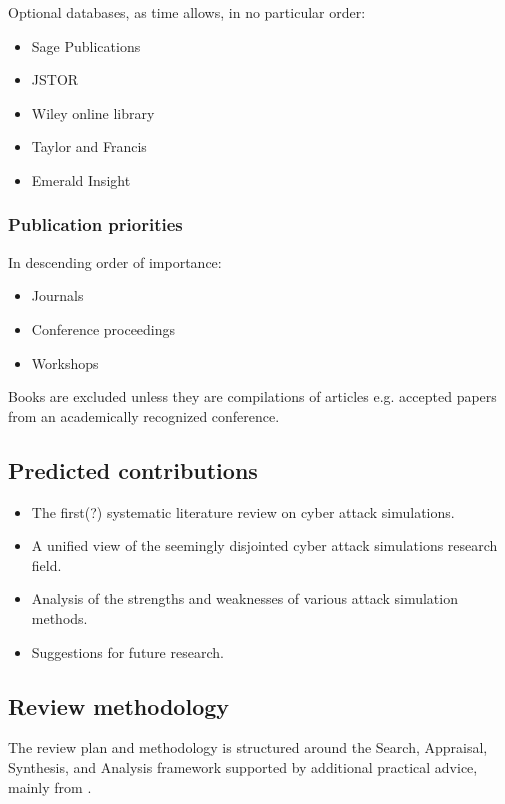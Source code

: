 \documentclass{article}
\begin{document}
\noindent Optional databases, as time allows, in no particular order:
\begin{itemize}
    \item Sage Publications
    \item JSTOR
    \item Wiley online library
    \item Taylor and Francis
    \item Emerald Insight
\end{itemize}

\subsubsection{Publication priorities}
In descending order of importance:
\begin{itemize}
    \item Journals
    \item Conference proceedings
    \item Workshops
\end{itemize}

\noindent Books are excluded unless they are compilations of articles e.g. accepted papers from an academically recognized conference.

\subsection{Predicted contributions}
\begin{itemize}
    \item The first(?) systematic literature review on cyber attack simulations.
    \item A unified view of the seemingly disjointed cyber attack simulations research field.
    \item Analysis of the strengths and weaknesses of various attack simulation methods.
    \item Suggestions for future research.
\end{itemize}

\subsection{Review methodology}

The review plan and methodology is structured around the Search, Appraisal, Synthesis, and Analysis framework \cite{booth2012} supported by additional practical advice, mainly from \cite{Kitchenham07, okoli2010}.
\end{document}
